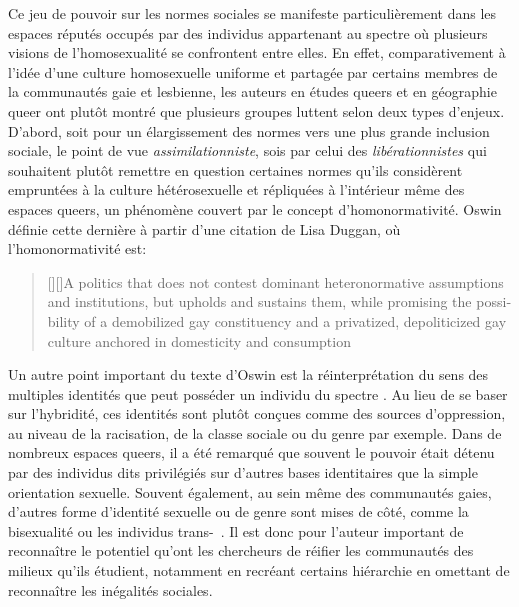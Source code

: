 Ce jeu de pouvoir sur les normes sociales se manifeste particulièrement dans les espaces réputés occupés par des individus appartenant au spectre \lgbt{} où plusieurs visions de l'homosexualité se confrontent entre elles. 
En effet, comparativement à l'idée d'une culture homosexuelle uniforme et partagée par certains membres de la communautés gaie et lesbienne, les auteurs en études queers et en géographie queer ont plutôt montré que plusieurs groupes luttent selon deux types d'enjeux.
D'abord, soit pour un élargissement des normes vers une plus grande inclusion sociale, le point de vue \emph{assimilationniste}, sois par celui des \emph{libérationnistes} qui souhaitent plutôt remettre en question certaines normes qu'ils considèrent empruntées à la culture hétérosexuelle et répliquées à l'intérieur même des espaces queers, un phénomène couvert par le concept d'homonormativité. 
Oswin définie cette dernière à partir d'une citation de Lisa Duggan, où l'homonormativité est: 
\foreignblockquote{english}[{\cite[tel que cité
  dans][92]{Oswin2008}}][]{[{\cite[50]{Duggan2003}}][]{A
    politics that does not contest dominant heteronormative assumptions and
    institutions, but upholds and sustains them, while promising the
    possibility of a demobilized gay constituency and a privatized,
    depoliticized gay culture anchored in domesticity and consumption}}.

Un autre point important du texte d'Oswin est la réinterprétation du sens des multiples identités que peut posséder un individu du spectre \lgbt{}. 
Au lieu de se baser sur l'hybridité, ces identités sont plutôt conçues comme des sources d'oppression, au niveau de la racisation, de la classe sociale ou du genre par exemple. 
Dans de nombreux espaces queers, il a été remarqué que souvent le pouvoir était détenu par des individus dits privilégiés sur d'autres bases identitaires que la simple orientation sexuelle. 
Souvent également, au sein même des communautés gaies, d'autres forme d'identité sexuelle ou de genre sont mises de côté, comme la bisexualité ou les individus trans-~\citep[93]{Oswin2008}.
Il est donc pour l'auteur important de reconnaître le potentiel qu'ont les chercheurs de réifier les communautés des milieux qu'ils étudient, notamment en recréant certains hiérarchie en omettant de reconnaître les inégalités sociales.

